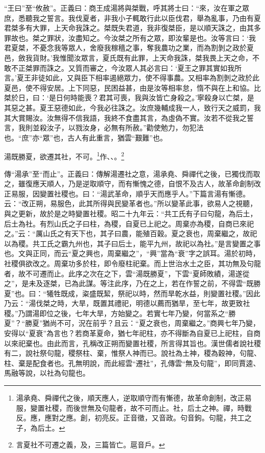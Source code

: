{\noindent\shu{}\fzkt “王曰”至“攸赦”。正義曰：商王成湯將與桀戰，呼其將士曰：“來，汝在軍之眾庶，悉聽我之誓言。我伐夏者，非我小子輒敢行此以臣伐君，舉為亂事，乃由有夏君桀多有大罪，上天命我誅之。桀既失君道，我非復桀臣，是以順天誅之，由其多罪故也。桀之罪狀，汝盡知之。今汝桀之所有之眾，即汝輩是也。汝等言曰：‘我君夏桀，不憂念我等眾人，舍廢我稼穡之事，奪我農功之業，而為割剝之政於夏邑，斂我貨財。’我惟聞汝眾言，夏氏既有此罪，上天命我誅，桀我畏上天之命，不敢不正桀罪而誅之。又質而審之，今汝眾人其必言曰：‘夏王之罪其實如我所言。’夏王非徒如此，又與臣下相率遏絕眾力，使不得事農。又相率為割剝之政於此夏邑，使不得安居。上下同惡，民困益甚，由是汝等相率怠，惰不與在上和協。比桀於日，曰：‘是日何時能喪？君其可喪，我與汝皆亡身殺之。’寧殺身以亡桀，是其惡之甚。夏王惡德如此，今我必往誅之。汝庶幾輔成我一人，致行天之威罰，我其大賞賜汝。汝無得不信我語，我終不食盡其言，為虛偽不實。汝若不從我之誓言，我則並殺汝子，以戮汝身，必無有所赦。”勸使勉力，勿犯法也。“庶”亦“眾”也，古人有此重言，猶雲“艱難”也。 \par}

湯既勝夏，欲遷其社，不可。\footnote{湯承堯、舜禪代之後，順天應人，逆取順守而有慚德，故革命創制，改正易服，變置社稷，而後世無及句龍者，故不可而止。社，后土之神。禪，時戰反。應，應對之應。創，初亮反。正音徵，又音政。句音鉤。句龍，共工之子，為后土。}作、、。\footnote{言夏社不可遷之義，及，三篇皆亡。扈音戶。}

{\noindent\zhuan{}\fzbyks 傳“湯承”至“而止”。正義曰：傳解湯遷社之意，湯承堯、舜禪代之後，已獨伐而取之，雖復應天順人，乃是逆取順守，而有慚愧之德，自恨不及古人，故革命創制改正易服，因變置社稷也。曰：“湯武革命，順乎天而應乎人。”下篇言湯有慚德。云：“改正朔，易服色，此其所得與民變革者也。”所以變革此事，欲易人之視聽，與之更新，故於是之時變置社稷。昭二十九年云：“共工氏有子曰句龍，為后土，后土為社。有烈山氏之子曰柱，為稷，自夏已上祀之。周棄亦為稷，自商已來祀之。”云：“厲山氏之有天下也，其子曰農，能殖百穀。夏之衰也，周棄繼之，故祀以為稷。共工氏之霸九州也，其子曰后土，能平九州，故祀以為社。”是言變置之事也。文與正同，而云“夏之興也，周棄繼之”，“興”當為“衰”字之誤耳。湯於初時，社稷俱欲改之。周棄功多於柱，即令廢柱祀棄。而上世治水土之臣，其功無及句龍者，故不可遷而止。此序之次在之下，雲“湯既勝夏”，下雲“夏師敗績，湯遂從之”，是未及逐桀，已為此謀。等注此序，乃在之上，若在作誓之前，不得雲“既勝夏”也。曰：“犧牲既成，粢盛既絜，祭祀以時，然而旱乾水益，則變置社稷。”因此乃云：“湯伐桀之時，大旱，既置其禮祀，明德以薦而猶旱，至七年，故更致社稷。”乃謂湯即位之後，七年大旱，方始變之。若實七年乃變，何當系之“勝夏”？“勝夏”猶尚不可，況在前乎？且云：“夏之衰也，周棄繼之。”商興七年乃變，安得以“夏衰”為言也？若商革夏命，猶七年祀柱，亦不得斷為自夏已上祀柱，自商以來祀棄也。由此而言，孔稱改正朔而變置社稷，所言得其旨也。漢世儒者說社稷有二，說社祭句龍，稷祭柱、棄，惟祭人神而已。說社為土神，稷為穀神，句龍、柱、棄是配食者也。孔無明說，而此經雲“遷社”，孔傳雲“無及句龍”，即同賈逵、馬融等說，以社為句龍也。 \par}

